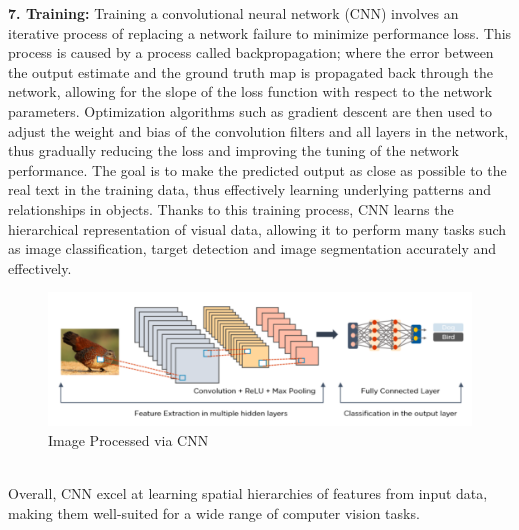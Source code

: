 \textbf{7. Training:}
Training a convolutional neural network (CNN) involves an iterative process of replacing a network failure to minimize performance loss. This process is caused by a process called backpropagation; where the error between the output estimate and the ground truth map is propagated back through the network, allowing for the slope of the loss function with respect to the network parameters. Optimization algorithms such as gradient descent are then used to adjust the weight and bias of the convolution filters and all layers in the network, thus gradually reducing the loss and improving the tuning of the network performance. The goal is to make the predicted output as close as possible to the real text in the training data, thus effectively learning underlying patterns and relationships in objects. Thanks to this training process, CNN learns the hierarchical representation of visual data, allowing it to perform many tasks such as image classification, target detection and image segmentation accurately and effectively.
\\
 \begin{figure}[hbt!]
  \centering
 \includegraphics[width=0.9\linewidth]{C_chap/fig30.png}
     \caption{Image Processed via CNN}
\end{figure}
\\
Overall, CNN excel at learning spatial hierarchies of features from input data, making them well-suited for a wide range of computer vision tasks.
